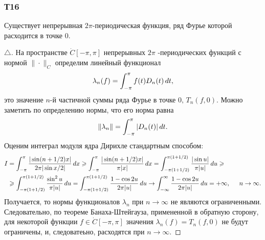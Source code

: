
\subsubsection*{Т16}


\begin{to_thr}
    Существует непрерывная $2\pi$-периодическая функция, ряд Фурье которой расходится в точке 0.
\end{to_thr}

\begin{proof}[$\triangle$]
На пространстве $\dot{C}[-\pi, \pi]$ непрерывных $2\pi$ -периодических функций с нормой $\|\cdot\|_C$ определим линейный функционал 
\begin{equation*}
    \lambda_n (f) = \int_{-\pi}^{\pi} f(t) D_n(t) \, d t,
\end{equation*}
это значение $n$-й частичной суммы ряда Фурье в точке $0,\, T_n(f, 0)$. Можно заметить по определению нормы, что его норма равна
\begin{equation*}
    \|\lambda_n\| = \int_{-\pi}^{\pi} |D_n(t)| \, d t.
\end{equation*}
Оценим интеграл модуля ядра Дирихле стандартным способом:
\begin{align*}
    I &= \int_{-\pi}^{\pi} \frac{|\sin(n+1/2)x|}{2 \pi |\sin x/2|} \, d x \geqslant 
    \int_{-\pi}^{\pi} \frac{|\sin(n+1/2)x|}{\pi |x|} \, d x =  \int_{-\pi(1+1/2)}^{\pi(1+1/2)} \frac{|\sin u|}{\pi |u|} \, d u 
    \geqslant \\ &\geqslant 
    \int_{-\pi(1+1/2)}^{\pi(1+1/2)} \frac{\sin^2 u}{\pi |u|} \, d u = \int_{-\pi(1+1/2)}^{\pi(1+1/2)} \frac{1-\cos 2u}{2\pi |u|}\, d u \to 
    \int_{-\infty}^{\infty} \frac{1 - \cos 2 u}{2\pi |u|} \, d u = + \infty,
    \hspace{5 mm} 
    n \to \infty.
\end{align*}
Получается, то нормы функционалов $\lambda_n$ при $n \to \infty$ не являются ограниченными. Следовательно, по теореме Банаха-Штейгауза, примененной в обратную сторону, для некоторой функции $f \in \dot{C}[-\pi, \pi]$ значения $\lambda_n (f) = T_n(f, 0)$ не будут ограничены, и, следоватеьно, расходятся при $n \to \infty$. 


\end{proof}